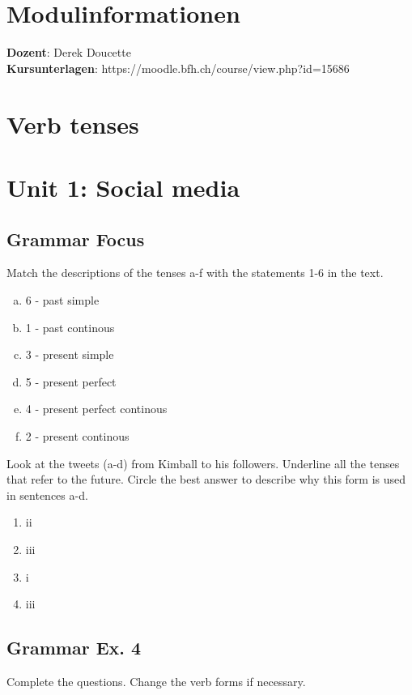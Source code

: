\documentclass[12pt, a4paper, oneside]{article}
\title{\vspace{-1.5cm}\subjectIdentifier{}\\\subject{}}
\author{\vspace{-1.5cm}}
\date{\vspace{-1.5cm}}
\begin{document}
  \maketitle
  \thispagestyle{fancy}
  
  \section{Modulinformationen}
  {\bf Dozent}: Derek Doucette\\
  {\bf Kursunterlagen}: https://moodle.bfh.ch/course/view.php?id=15686\\
  
  \section{Verb tenses}

  \newpage
  \section{Unit 1: Social media}
  \subsection{Grammar Focus}
  
  Match the descriptions of the tenses a-f with the statements 1-6 in the text.
  \begin{enumerate}[a)] 
    \item 6 - past simple
    \item 1 - past continous
    \item 3 - present simple
    \item 5 - present perfect
    \item 4 - present perfect continous
    \item 2 - present continous
  \end{enumerate}

  Look at the tweets (a-d) from Kimball to his followers. Underline all the tenses that refer to the future. Circle the best answer to describe why this form is used in sentences a-d.
  \begin{enumerate}[1.]
    \item ii
    \item iii
    \item i
    \item iii
  \end{enumerate}

  \subsection{Grammar Ex.  4}
  Complete the questions. Change the verb forms if necessary.
\end{document}
